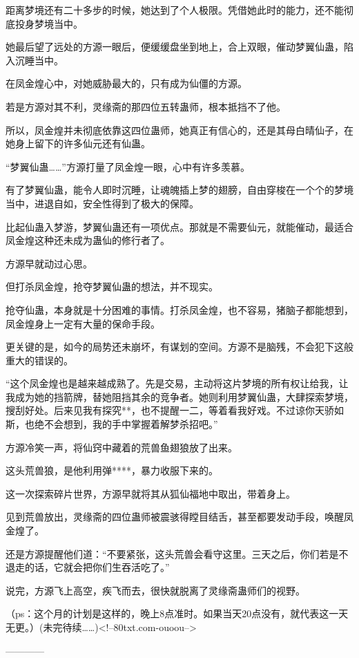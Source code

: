 \begin{this_body}
距离梦境还有二十多步的时候，她达到了个人极限。凭借她此时的能力，还不能彻底投身梦境当中。

她最后望了远处的方源一眼后，便缓缓盘坐到地上，合上双眼，催动梦翼仙蛊，陷入沉睡当中。

在凤金煌心中，对她威胁最大的，只有成为仙僵的方源。

若是方源对其不利，灵缘斋的那四位五转蛊师，根本抵挡不了他。

所以，凤金煌并未彻底依靠这四位蛊师，她真正有信心的，还是其母白晴仙子，在她身上留下的许多仙元还有仙蛊。

“梦翼仙蛊……”方源打量了凤金煌一眼，心中有许多羡慕。

有了梦翼仙蛊，能令人即时沉睡，让魂魄插上梦的翅膀，自由穿梭在一个个的梦境当中，进退自如，安全性得到了极大的保障。

比起仙蛊入梦游，梦翼仙蛊还有一项优点。那就是不需要仙元，就能催动，最适合凤金煌这种还未成为蛊仙的修行者了。

方源早就动过心思。

但打杀凤金煌，抢夺梦翼仙蛊的想法，并不现实。

抢夺仙蛊，本身就是十分困难的事情。打杀凤金煌，也不容易，猪脑子都能想到，凤金煌身上一定有大量的保命手段。

更关键的是，如今的局势还未崩坏，有谋划的空间。方源不是脑残，不会犯下这般重大的错误的。

“这个凤金煌也是越来越成熟了。先是交易，主动将这片梦境的所有权让给我，让我成为她的挡箭牌，替她阻挡其余的竞争者。她则利用梦翼仙蛊，大肆探索梦境，搜刮好处。后来见我有探究**，也不提醒一二，等着看我好戏。不过谅你天骄如斯，也绝不会想到，我的手中掌握着解梦杀招吧。”

方源冷笑一声，将仙窍中藏着的荒兽鱼翅狼放了出来。

这头荒兽狼，是他利用弹****，暴力收服下来的。

这一次探索碎片世界，方源早就将其从狐仙福地中取出，带着身上。

见到荒兽放出，灵缘斋的四位蛊师被震骇得瞠目结舌，甚至都要发动手段，唤醒凤金煌了。

还是方源提醒他们道：“不要紧张，这头荒兽会看守这里。三天之后，你们若是不退走的话，它就会把你们生吞活吃了。”

说完，方源飞上高空，疾飞而去，很快就脱离了灵缘斋蛊师们的视野。

（ps：这个月的计划是这样的，晚上8点准时。如果当天20点没有，就代表这一天无更。）(未完待续……)<!--80txt.com-ouoou-->

------------

\end{this_body}

